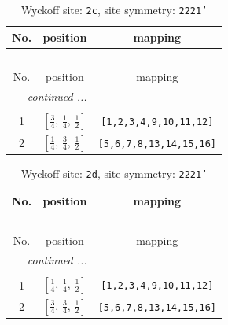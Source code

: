 \documentclass[fleqn,8pt]{jsarticle}
\begin{document}
\renewcommand{\arraystretch}{1.2}
\begin{longtable}{ccc}
\caption{Wyckoff site: {\tt 2c}, site symmetry: {\tt 2221'}}
 \\
 \hline \hline
No. & position & mapping \\ \hline \endfirsthead

\multicolumn{2}{l}{\tablename\ \thetable{}} \\
 \hline \hline
No. & position & mapping \\ \hline \endhead

 \hline \hline
\multicolumn{2}{r}{\footnotesize\it continued ...} \\ \endfoot

 \hline \hline
\multicolumn{2}{r}{} \\ \endlastfoot

1 & $\left[ \frac{3}{4},\, \frac{1}{4},\, \frac{1}{2} \right]$ & {\tt [1,2,3,4,9,10,11,12]} \\ \hline
2 & $\left[ \frac{1}{4},\, \frac{3}{4},\, \frac{1}{2} \right]$ & {\tt [5,6,7,8,13,14,15,16]} \\
\end{longtable}
\renewcommand{\arraystretch}{1.2}
\begin{longtable}{ccc}
\caption{Wyckoff site: {\tt 2d}, site symmetry: {\tt 2221'}}
 \\
 \hline \hline
No. & position & mapping \\ \hline \endfirsthead

\multicolumn{2}{l}{\tablename\ \thetable{}} \\
 \hline \hline
No. & position & mapping \\ \hline \endhead

 \hline \hline
\multicolumn{2}{r}{\footnotesize\it continued ...} \\ \endfoot

 \hline \hline
\multicolumn{2}{r}{} \\ \endlastfoot

1 & $\left[ \frac{1}{4},\, \frac{1}{4},\, \frac{1}{2} \right]$ & {\tt [1,2,3,4,9,10,11,12]} \\ \hline
2 & $\left[ \frac{3}{4},\, \frac{3}{4},\, \frac{1}{2} \right]$ & {\tt [5,6,7,8,13,14,15,16]} \\
\end{longtable}
\renewcommand{\arraystretch}{1.2}
\end{document}
